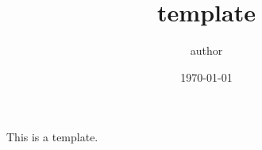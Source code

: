 \documentclass[dvipdfmx,uplatex,titlepage]{jsarticle}
\title{template}
\author{author}
\date{\today}
\begin{document}
\maketitle
This is a template.
\end{document}
